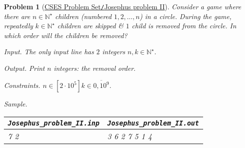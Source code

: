 \documentclass{article}
\newtheorem{problem}{Problem}
\begin{document}
\begin{problem}[\href{https://cses.fi/problemset/task/2163}{CSES Problem Set{\tt/}Josephus problem II}]
    Consider a game where there are $n\in\mathbb{N}^\star$ children (numbered $1,2,\ldots,n$) in a circle. During the game, repeatedly $k\in\mathbb{N}^\star$ children are skipped \& $1$ child is removed from the circle. In which order will the children be removed?
    \item {\sf Input.} The only input line has $2$ integers $n,k\in\mathbb{N}^\star$.
    \item {\sf Output.} Print $n$ integers: the removal order.
    \item {\sf Constraints.} $n\in[2\cdot10^5]k\in\overline{0,10^9}$.
    \item {\sf Sample.}
    \begin{table}[H]
        \centering
        \begin{tabular}{|l|l|}
            \hline
            \verb|Josephus_problem_II.inp| & \verb|Josephus_problem_II.out| \\
            \hline
            7 2 & 3 6 2 7 5 1 4 \\
            \hline
        \end{tabular}
    \end{table}
\end{problem}
\end{document}
